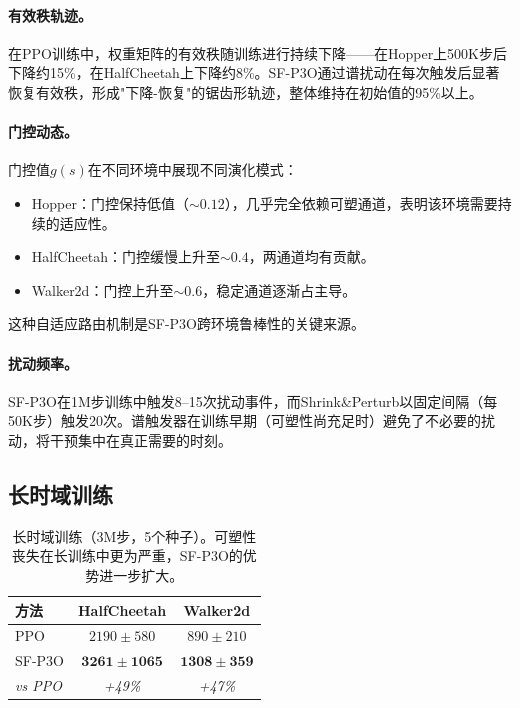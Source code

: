 \documentclass[twocolumn]{article}
\begin{document}
\paragraph{有效秩轨迹。} 在PPO训练中，权重矩阵的有效秩随训练进行持续下降——在Hopper上500K步后下降约15\%，在HalfCheetah上下降约8\%。SF-P3O通过谱扰动在每次触发后显著恢复有效秩，形成"下降-恢复"的锯齿形轨迹，整体维持在初始值的95\%以上。

\paragraph{门控动态。} 门控值$g(s)$在不同环境中展现不同演化模式：
\begin{itemize}[leftmargin=*]
    \item Hopper：门控保持低值（$\sim 0.12$），几乎完全依赖可塑通道，表明该环境需要持续的适应性。
    \item HalfCheetah：门控缓慢上升至$\sim 0.4$，两通道均有贡献。
    \item Walker2d：门控上升至$\sim 0.6$，稳定通道逐渐占主导。
\end{itemize}
这种自适应路由机制是SF-P3O跨环境鲁棒性的关键来源。

\paragraph{扰动频率。} SF-P3O在1M步训练中触发8--15次扰动事件，而Shrink\&Perturb以固定间隔（每50K步）触发20次。谱触发器在训练早期（可塑性尚充足时）避免了不必要的扰动，将干预集中在真正需要的时刻。


\subsection{长时域训练}
\label{sec:longrun}

\begin{table}[t]
\centering
\caption{长时域训练（3M步，5个种子）。可塑性丧失在长训练中更为严重，SF-P3O的优势进一步扩大。}
\label{tab:longrun}
\begin{tabular}{lcc}
\toprule
\textbf{方法} & \textbf{HalfCheetah} & \textbf{Walker2d} \\
\midrule
PPO     & $2190 \pm 580$  & $890 \pm 210$  \\
SF-P3O  & $\mathbf{3261 \pm 1065}$ & $\mathbf{1308 \pm 359}$ \\
\quad \textit{vs PPO} & \textit{+49\%} & \textit{+47\%} \\
\bottomrule
\end{tabular}
\end{table}
\end{document}
